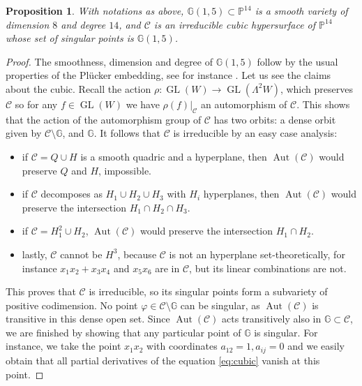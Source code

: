 \documentclass[10pt,reqno]{amsart}
\newcommand{\cC}{{\mathcal{C}}}
\newcommand{\GG}{\mathbb{G}}
\newcommand{\PP}{\mathbb P}
\newcommand{\GL}{\operatorname{GL}}
\DeclareMathOperator{\Aut}{Aut}
\newcommand{\f}{\varphi}
\renewcommand{\L}{\Lambda}
\newtheorem{proposition}[theorem]{Proposition}
\theoremstyle{definition}
\begin{document}
\begin{proposition} \label{prop:C-is-singular}
With notations as above, $\GG(1,5) \subset \PP^{14}$ is a smooth variety of dimension $8$ and degree $14$, and $\cC$ is an irreducible cubic hypersurface of $\PP^{14}$ whose set of singular points is $\GG(1,5)$.
\end{proposition}
\begin{proof}
The smoothness, dimension and degree of $\GG(1,5)$ follow by the usual properties of the Plücker embedding, see for instance \cite[p. 245]{Harris}. Let us see the claims about the cubic. Recall the action $\rho \colon \GL(W) \to \GL(\L^2 W)$, which preserves $\cC$ so for any $f \in \GL(W)$ we have $\rho(f)|_\cC$ an automorphism of $\cC$. This shows that the action of the automorphism group of $\cC$ has two orbits: a dense orbit given by $\cC \setminus \GG$, and $\GG$. It follows that $\cC$ is irreducible by an easy case analysis:
\begin{itemize}
    \item if $\cC=Q \cup H$ is a smooth quadric and a hyperplane, then $\Aut(\cC)$ would preserve $Q$ and $H$, impossible.
    \item if $\cC$ decomposes as $H_1 \cup H_2 \cup H_3$ with $H_i$ hyperplanes, then $\Aut(\cC)$ would preserve the intersection $H_1 \cap H_2 \cap H_3$.
    \item if $\cC=H_1^2 \cup H_2$, $\Aut(\cC)$ would preserve the intersection $H_1 \cap H_2$.
    \item lastly, $\cC$ cannot be $H^3$, because $\cC$ is not an hyperplane set-theoretically, for instance $x_1x_2+x_3x_4$ and $x_5x_6$ are in $\cC$, but its linear combinations are not.
\end{itemize}
This proves that $\cC$ is irreducible, so its singular points form a subvariety of positive codimension. No point $\f \in \cC \setminus \GG$ can be singular, as $\Aut(\cC)$ is transitive in this dense open set. Since $\Aut(\cC)$ acts transitively also in $\GG \subset \cC$, we are finished by showing that any particular point of $\GG$ is singular. For instance, we take the point $x_1x_2$ with coordinates $a_{12}=1, a_{ij}=0$ and we easily obtain that all partial derivatives of the equation \eqref{eq:cubic} vanish at this point.
\end{proof}



\end{document}
